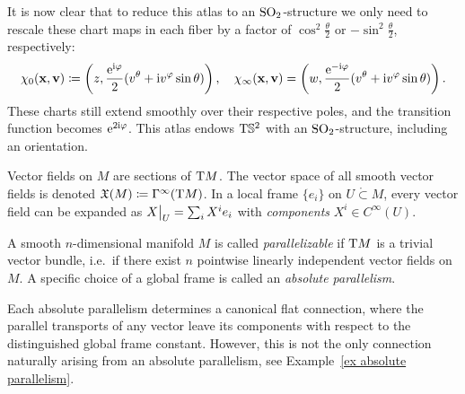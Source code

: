\begin{example}
    It is now clear that to reduce this atlas to an $\operatorname{SO}_2$-structure we only need to rescale these chart maps in each fiber by a factor of $\cos^2\frac{\theta}{2}$ or $-\sin^2\frac{\theta}{2}$, respectively:
    \[\chi_0(\mathbf{x},\mathbf{v})\coloneqq \left(z,\frac{\mathrm{e}^{\mathrm{i}\varphi}}{2}(v^\theta+\mathrm{i} v^\varphi\sin\theta) \right),\quad \chi_\infty(\mathbf{x},\mathbf{v})=\left(w,\frac{\mathrm{e}^{-\mathrm{i}\varphi}}{2}(v^\theta+\mathrm{i} v^\varphi\sin\theta )\right).\] 
    These charts still extend smoothly over their respective poles, and the transition function becomes $\mathrm{e}^{2\mathrm{i}\varphi}$. This atlas endows $\mathrm{T}\mathbb{S}^2$ with an $\operatorname{SO}_2$-structure, including an orientation.
\end{example}


\begin{defn}
    Vector fields on $M$ are sections of $\mathrm{T} M$. The vector space of all smooth vector fields is denoted $\mathfrak{X}(M)\coloneqq \Gamma^\infty(\mathrm{T} M)$. In a local frame $\{e_i\}$ on $U\mathring{\subset}M$, every vector field can be expanded as $\restr{X}{U}=\sum_i X^i e_i$ with \emph{components} $X^i\in C^\infty(U)$.
\end{defn}

\begin{defn}[Parallelism]\label{def parallelizable}
    A smooth $n$-dimensional manifold $M$ is called \emph{parallelizable} if $\mathrm{T} M$ is a trivial vector bundle, i.e.\ if there exist $n$ pointwise linearly independent vector fields on $M$. A specific choice of a global frame is called an \emph{absolute parallelism}.
\end{defn}

\begin{rem}
     Each absolute parallelism determines a canonical flat connection, where the parallel transports of any vector leave its components with respect to the distinguished global frame constant. However, this is not the only connection naturally arising from an absolute parallelism, see Example~\ref{ex absolute parallelism}.
\end{rem}

